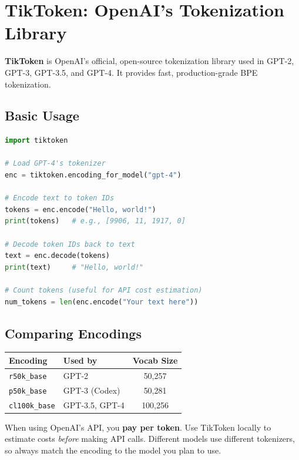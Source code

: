 \documentclass[11pt,a4paper]{article}
\begin{document}
\section{TikToken: OpenAI's Tokenization Library}

\textbf{TikToken} is OpenAI's official, open-source tokenization library used in GPT-2, GPT-3, GPT-3.5, and GPT-4. It provides fast, production-grade BPE tokenization.

\subsection{Basic Usage}

\begin{lstlisting}[language=Python]
import tiktoken

# Load GPT-4's tokenizer
enc = tiktoken.encoding_for_model("gpt-4")

# Encode text to token IDs
tokens = enc.encode("Hello, world!")
print(tokens)   # e.g., [9906, 11, 1917, 0]

# Decode token IDs back to text
text = enc.decode(tokens)
print(text)     # "Hello, world!"

# Count tokens (useful for API cost estimation)
num_tokens = len(enc.encode("Your text here"))
\end{lstlisting}

\subsection{Comparing Encodings}

\begin{center}
\renewcommand{\arraystretch}{1.3}
\begin{tabular}{@{}llc@{}}
\toprule
\textbf{Encoding} & \textbf{Used by} & \textbf{Vocab Size} \\
\midrule
\texttt{r50k\_base} & GPT-2 & 50,257 \\
\texttt{p50k\_base} & GPT-3 (Codex) & 50,281 \\
\texttt{cl100k\_base} & GPT-3.5, GPT-4 & 100,256 \\
\bottomrule
\end{tabular}
\end{center}

\begin{tcolorbox}[warnbox={Practical Tip}]
When using OpenAI's API, you \textbf{pay per token}. Use TikToken locally to estimate costs \emph{before} making API calls. Different models use different tokenizers, so always match the encoding to the model you plan to use.
\end{tcolorbox}
\end{document}

